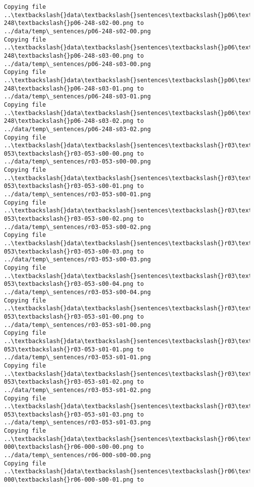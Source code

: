 \documentclass[11pt]{article}
\begin{document}
\begin{Verbatim}[commandchars=\\\{\}]
Copying file ..\textbackslash{}data\textbackslash{}sentences\textbackslash{}p06\textbackslash{}p06-248\textbackslash{}p06-248-s02-00.png to
../data/temp\_sentences/p06-248-s02-00.png
Copying file ..\textbackslash{}data\textbackslash{}sentences\textbackslash{}p06\textbackslash{}p06-248\textbackslash{}p06-248-s03-00.png to
../data/temp\_sentences/p06-248-s03-00.png
Copying file ..\textbackslash{}data\textbackslash{}sentences\textbackslash{}p06\textbackslash{}p06-248\textbackslash{}p06-248-s03-01.png to
../data/temp\_sentences/p06-248-s03-01.png
Copying file ..\textbackslash{}data\textbackslash{}sentences\textbackslash{}p06\textbackslash{}p06-248\textbackslash{}p06-248-s03-02.png to
../data/temp\_sentences/p06-248-s03-02.png
Copying file ..\textbackslash{}data\textbackslash{}sentences\textbackslash{}r03\textbackslash{}r03-053\textbackslash{}r03-053-s00-00.png to
../data/temp\_sentences/r03-053-s00-00.png
Copying file ..\textbackslash{}data\textbackslash{}sentences\textbackslash{}r03\textbackslash{}r03-053\textbackslash{}r03-053-s00-01.png to
../data/temp\_sentences/r03-053-s00-01.png
Copying file ..\textbackslash{}data\textbackslash{}sentences\textbackslash{}r03\textbackslash{}r03-053\textbackslash{}r03-053-s00-02.png to
../data/temp\_sentences/r03-053-s00-02.png
Copying file ..\textbackslash{}data\textbackslash{}sentences\textbackslash{}r03\textbackslash{}r03-053\textbackslash{}r03-053-s00-03.png to
../data/temp\_sentences/r03-053-s00-03.png
Copying file ..\textbackslash{}data\textbackslash{}sentences\textbackslash{}r03\textbackslash{}r03-053\textbackslash{}r03-053-s00-04.png to
../data/temp\_sentences/r03-053-s00-04.png
Copying file ..\textbackslash{}data\textbackslash{}sentences\textbackslash{}r03\textbackslash{}r03-053\textbackslash{}r03-053-s01-00.png to
../data/temp\_sentences/r03-053-s01-00.png
Copying file ..\textbackslash{}data\textbackslash{}sentences\textbackslash{}r03\textbackslash{}r03-053\textbackslash{}r03-053-s01-01.png to
../data/temp\_sentences/r03-053-s01-01.png
Copying file ..\textbackslash{}data\textbackslash{}sentences\textbackslash{}r03\textbackslash{}r03-053\textbackslash{}r03-053-s01-02.png to
../data/temp\_sentences/r03-053-s01-02.png
Copying file ..\textbackslash{}data\textbackslash{}sentences\textbackslash{}r03\textbackslash{}r03-053\textbackslash{}r03-053-s01-03.png to
../data/temp\_sentences/r03-053-s01-03.png
Copying file ..\textbackslash{}data\textbackslash{}sentences\textbackslash{}r06\textbackslash{}r06-000\textbackslash{}r06-000-s00-00.png to
../data/temp\_sentences/r06-000-s00-00.png
Copying file ..\textbackslash{}data\textbackslash{}sentences\textbackslash{}r06\textbackslash{}r06-000\textbackslash{}r06-000-s00-01.png to

\end{Verbatim}
\end{document}
